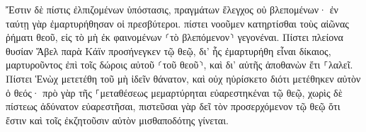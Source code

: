 \documentclass{openreader}
\begin{document}
Ἔστιν δὲ πίστις ἐλπιζομένων ὑπόστασις, πραγμάτων ἔλεγχος οὐ βλεπομένων· 
ἐν ταύτῃ γὰρ ἐμαρτυρήθησαν οἱ πρεσβύτεροι. 
πίστει νοοῦμεν κατηρτίσθαι τοὺς αἰῶνας ῥήματι θεοῦ, εἰς τὸ μὴ ἐκ φαινομένων ⸂τὸ βλεπόμενον⸃ γεγονέναι. 
Πίστει πλείονα θυσίαν Ἅβελ παρὰ Κάϊν προσήνεγκεν τῷ θεῷ, δι’ ἧς ἐμαρτυρήθη εἶναι δίκαιος, μαρτυροῦντος ἐπὶ τοῖς δώροις αὐτοῦ ⸂τοῦ θεοῦ⸃, καὶ δι’ αὐτῆς ἀποθανὼν ἔτι ⸀λαλεῖ. 
Πίστει Ἑνὼχ μετετέθη τοῦ μὴ ἰδεῖν θάνατον, καὶ οὐχ ηὑρίσκετο διότι μετέθηκεν αὐτὸν ὁ θεός· πρὸ γὰρ τῆς ⸀μεταθέσεως μεμαρτύρηται εὐαρεστηκέναι τῷ θεῷ, 
χωρὶς δὲ πίστεως ἀδύνατον εὐαρεστῆσαι, πιστεῦσαι γὰρ δεῖ τὸν προσερχόμενον τῷ θεῷ ὅτι ἔστιν καὶ τοῖς ἐκζητοῦσιν αὐτὸν μισθαποδότης γίνεται. 
\end{document}
